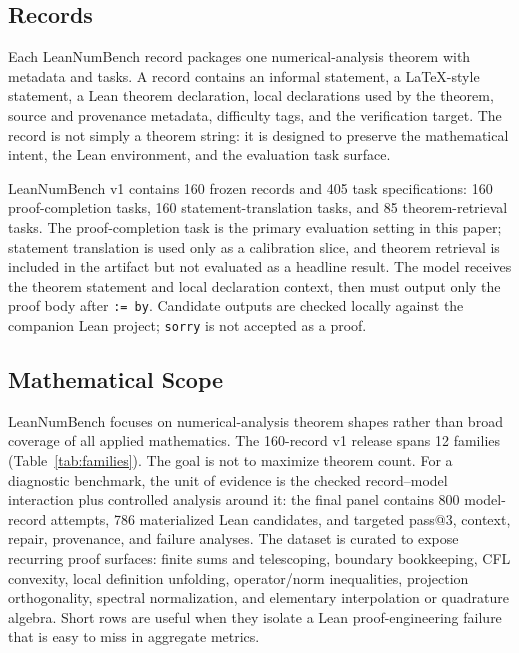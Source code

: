 \documentclass{article}
\begin{document}
\subsection{Records}

Each LeanNumBench record packages one numerical-analysis theorem with metadata and
tasks. A record contains an informal statement, a LaTeX-style statement, a
Lean theorem declaration, local declarations used by the theorem, source and
provenance metadata, difficulty tags, and the verification target. The
record is not simply a theorem string: it is designed to preserve the
mathematical intent, the Lean environment, and the evaluation task surface.

LeanNumBench v1 contains 160 frozen records and 405 task specifications:
160 proof-completion tasks, 160 statement-translation tasks, and 85
theorem-retrieval tasks. The proof-completion task is the primary evaluation
setting in this paper; statement translation is used only as a calibration
slice, and theorem retrieval is included in the artifact but not evaluated as a
headline result. The model receives the theorem statement and local declaration
context, then must output only the proof body after \texttt{:= by}. Candidate
outputs are checked locally against the companion Lean project; \texttt{sorry}
is not accepted as a proof.

\subsection{Mathematical Scope}

LeanNumBench focuses on numerical-analysis theorem shapes rather than broad
coverage of all applied mathematics. The 160-record v1 release spans 12
families (Table~\ref{tab:families}). The goal is not to maximize theorem
count. For a diagnostic benchmark, the unit of evidence is the checked
record--model interaction plus controlled analysis around it: the final panel
contains 800 model-record attempts, 786 materialized Lean candidates, and
targeted pass@3, context, repair, provenance, and failure analyses. The dataset is curated to expose recurring
proof surfaces: finite sums and telescoping, boundary bookkeeping, CFL
convexity, local definition unfolding, operator/norm inequalities, projection
orthogonality, spectral normalization, and elementary interpolation or
quadrature algebra. Short rows are useful when they isolate a Lean
proof-engineering failure that is easy to miss in aggregate metrics.
\end{document}
